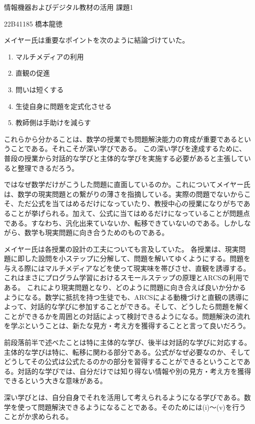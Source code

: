 \documentclass[a4paper, 11pt]{ltjsarticle}
\begin{document}
\begin{center}
    {\large 情報機器およびデジタル教材の活用 課題1}
\end{center}
\begin{flushright}
    22B41185 橋本龍徳
\end{flushright}
メイヤー氏は重要なポイントを次のように結論づけていた。
\begin{enumerate}
    \item マルチメディアの利用
    \item 直観の促進
    \item 問いは短くする
    \item 生徒自身に問題を定式化させる
    \item 教師側は手助けを減らす
\end{enumerate}
これらから分かることは、数学の授業でも問題解決能力の育成が重要であるということである。それこそが深い学びである。
この深い学びを達成するために、普段の授業から対話的な学びと主体的な学びを実施する必要があると主張していると整理できるだろう。

ではなぜ数学だけがこうした問題に直面しているのか。これについてメイヤー氏は、数学の現実問題との繋がりの薄さを指摘している。実際の問題でないからこそ、ただ公式を当てはめるだけになっていたり、教授中心の授業になりがちであることが挙げられる。加えて、公式に当てはめるだけになっていることが問題点である。すなわち、汎化出来ていないか、転移できていないのである。しかしながら、数学も現実問題に向き合うためのものである。

メイヤー氏は各授業の設計の工夫についても言及していた。
各授業は、現実問題に即した設問を小ステップに分解して、問題を解いてゆくようにする。問題を与える際にはマルチメディアなどを使って現実味を帯びさせ、直観を誘導する。
これはまさにプログラム学習におけるスモールステップの原理とARCSの利用である。
これにより現実問題となり、どのように問題に向き合えば良いか分かるようになる。数学に抵抗を持つ生徒でも、ARCSによる動機づけと直観の誘導によって、対話的な学びに参加することができる。そして、どうしたら問題を解くことができるかを周囲との対話によって検討できるようになる。問題解決の流れを学ぶということは、新たな見方・考え方を獲得することと言って良いだろう。

前段落前半で述べたことは特に主体的な学び、後半は対話的な学びに対応する。主体的な学びは特に、転移に関わる部分である。公式がなぜ必要なのか、そしてどうしてその公式は公式たるのかの部分を習得することができるということである。対話的な学びでは、自分だけでは知り得ない情報や別の見方・考え方を獲得できるという大きな意味がある。

深い学びとは、自分自身でそれを活用して考えられるようになる学びである。数学を使って問題解決できるようになることである。そのためには(i)〜(v)を行うことがか求められる。
\end{document}
